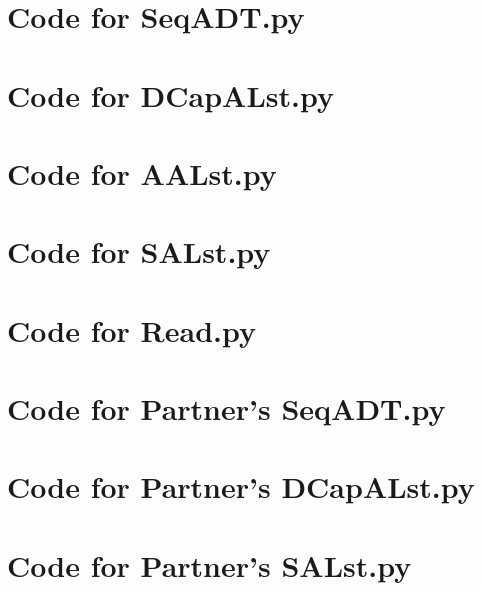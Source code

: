 \documentclass[12pt]{article}
\begin{document}
\newpage

\section{Code for SeqADT.py}

\noindent 

\newpage

\section{Code for DCapALst.py}

\noindent 

\newpage

\section{Code for AALst.py}

\noindent 

\newpage

\section{Code for SALst.py}

\noindent 

\newpage

\section{Code for Read.py}

\noindent 

\newpage

\section{Code for Partner's SeqADT.py}

\noindent 

\newpage

\section{Code for Partner's DCapALst.py}

\noindent 

\newpage

\section{Code for Partner's SALst.py}

\noindent 
\end{document}
